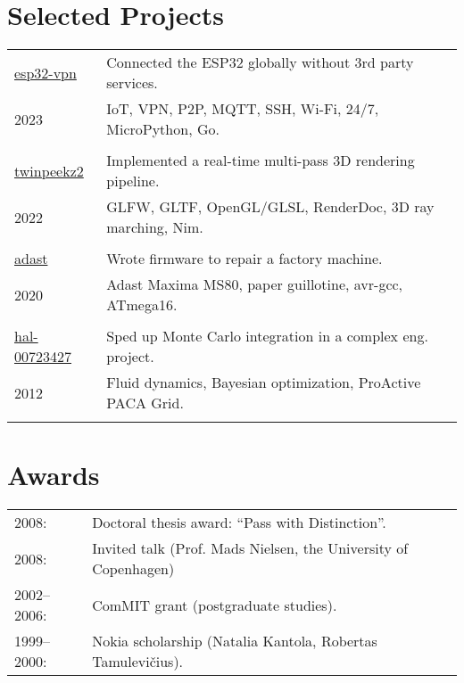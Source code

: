 \documentclass[a4paper,11pt]{article}
\begin{document}
\section*{Selected Projects}
\label{sect:pubs}

\begin{tabular}{ll}
\href{https://github.com/aabbtree77/esp32-vpn}{esp32-vpn} & Connected the ESP32 globally without 3rd party services.\\
               2023    & IoT, VPN, P2P, MQTT, SSH, Wi-Fi, 24/7, MicroPython, Go.\\
                       &\\
\href{https://github.com/aabbtree77/twinpeekz2}{twinpeekz2}    & Implemented a real-time multi-pass 3D rendering pipeline.\\
                   2022       & GLFW, GLTF, OpenGL/GLSL, RenderDoc, 3D ray marching, Nim.\\
                          &\\
\href{https://github.com/aabbtree77/adast}{adast} & Wrote firmware to repair a factory machine. \\
2020 & Adast Maxima MS80, paper guillotine, avr-gcc, ATmega16. \\
     &\\                        
\href{https://hal.archives-ouvertes.fr/hal-00723427}{hal-00723427} & Sped up Monte Carlo integration in a complex eng. project.\\
                     2012 & Fluid dynamics, Bayesian optimization, ProActive PACA Grid.\\
                          &  \\        
\end{tabular}

%


%
%
\section*{Awards}
%
\begin{tabular}{ll}
        2008: & Doctoral thesis award: “Pass with Distinction”.\\
        2008: & Invited talk (Prof. Mads Nielsen, the University of Copenhagen)\\
        2002--2006:& ComMIT grant (postgraduate studies).\\
        1999--2000:& Nokia scholarship (Natalia Kantola, Robertas Tamulevi\v{c}ius).
\end{tabular}
%
%

\end{document}
